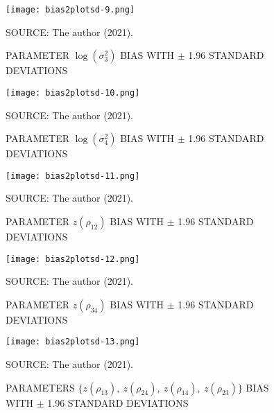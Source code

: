 \begin{figure}[H]
 \setlength{\abovecaptionskip}{.0001pt}
 \caption{PARAMETER \(\log(\sigma_{3}^{2})\) BIAS WITH \(\pm\) 1.96
          STANDARD DEVIATIONS}
 \vspace{0.2cm}\centering
 \texttt{[image: bias2plotsd-9.png]}\\
 \begin{footnotesize}
  SOURCE: The author (2021).
 \end{footnotesize}
 \label{fig:biassdlogs2_3}
\end{figure}

\begin{figure}[H]
 \setlength{\abovecaptionskip}{.0001pt}
 \caption{PARAMETER \(\log(\sigma_{4}^{2})\) BIAS WITH \(\pm\) 1.96
          STANDARD DEVIATIONS}
 \vspace{0.2cm}\centering
 \texttt{[image: bias2plotsd-10.png]}\\
 \begin{footnotesize}
  SOURCE: The author (2021).
 \end{footnotesize}
 \label{fig:biassdlogs2_4}
\end{figure}

\begin{figure}[H]
 \setlength{\abovecaptionskip}{.0001pt}
 \caption{PARAMETER \(z(\rho_{12})\) BIAS WITH \(\pm\) 1.96 STANDARD
          DEVIATIONS}
 \vspace{0.2cm}\centering
 \texttt{[image: bias2plotsd-11.png]}\\
 \begin{footnotesize}
  SOURCE: The author (2021).
 \end{footnotesize}
 \label{fig:biassdrhoz12}
\end{figure}

\begin{figure}[H]
 \setlength{\abovecaptionskip}{.0001pt}
 \caption{PARAMETER \(z(\rho_{34})\) BIAS WITH \(\pm\) 1.96 STANDARD
          DEVIATIONS}
 \vspace{0.2cm}\centering
 \texttt{[image: bias2plotsd-12.png]}\\
 \begin{footnotesize}
  SOURCE: The author (2021).
 \end{footnotesize}
 \label{fig:biassdrhoz34}
\end{figure}

\begin{figure}[H]
 \setlength{\abovecaptionskip}{.0001pt}
 \caption{PARAMETERS
          \(\{z(\rho_{13}),~z(\rho_{24}),~z(\rho_{14}),~z(\rho_{23})\}\)
          BIAS WITH \(\pm\) 1.96 STANDARD DEVIATIONS}
 \vspace{0.2cm}\centering
 \texttt{[image: bias2plotsd-13.png]}\\
 \begin{footnotesize}
  SOURCE: The author (2021).
 \end{footnotesize}
 \label{fig:biassdrhoz4}
\end{figure}

